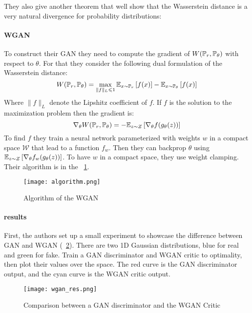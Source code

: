 They also give another theorem that well show that the Wasserstein distance is a very natural divergence for probability distributions:


\paragraph{WGAN}
To construct their GAN they need to compute the gradient of $W(\mathbb{P}_r, \mathbb{P}_\theta)$ with respect to $\theta$. For that they consider the following dual formulation of the Wasserstein distance:
$$ W(\mathbb{P}_r ,\mathbb{P}_\theta) = \max_{\| f \|_L \leqslant 1} \mathbb{E}_{x \sim \mathbb{P}_r} \left[ f(x) \right] - \mathbb{E}_{x \sim \mathbb{P}_\theta} \left[ f(x) \right] $$
Where $\| f \|_L$ denote the Lipshitz coefficient of $f$. If $f$ is the solution to the maximization problem then the gradient is:
$$ \nabla_\theta W(\mathbb{P}_r, \mathbb{P}_\theta) = - \mathbb{E}_{z \sim Z} \left[ \nabla_\theta f(g_\theta(z)) \right] $$
To find $f$ they train a neural network parameterized with weights $w$ in a compact space $\mathcal{W}$ that lead to a function $f_w$. Then they can backprop $\theta$ using $\mathbb{E}_{z \sim Z} \left[ \nabla_\theta f_w (g_\theta(z)) \right]$.  To have $w$ in a compact space, they use weight clamping. Their algorithm is in the \figurename~\ref{algo}.

\begin{figure}[t]
	\centering
	\texttt{[image: algorithm.png]}
	\caption{Algorithm of the WGAN}
	\label{algo}
\end{figure}

\paragraph{results}
First, the authors set up a small experiment to showcase the difference between GAN and WGAN (\figurename~\ref{compa}). There are two 1D Gaussian distributions, blue for real and green for fake. Train a GAN discriminator and WGAN critic to optimality, then plot their values over the space. The red curve is the GAN discriminator output, and the cyan curve is the WGAN critic output.

\begin{figure}[h]
	\centering
	\texttt{[image: wgan\_res.png]}
	\caption{Comparison between a GAN discriminator and the WGAN Critic}
	\label{compa}
\end{figure}

